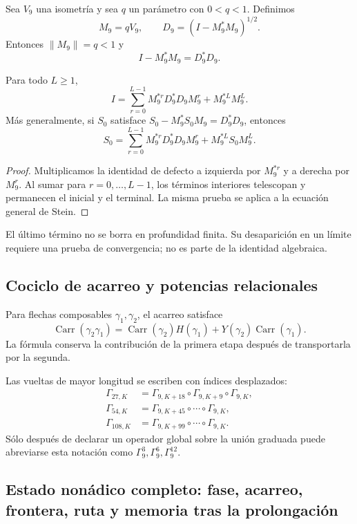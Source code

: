 Sea \(V_9\) una isometría y sea \(q\) un parámetro con \(0<q<1\). Definimos
\[
 M_9=qV_9,
 \qquad
 D_9=(I-M_9^*M_9)^{1/2}.
\]
Entonces \(\|M_9\|=q<1\) y
\[
 I-M_9^*M_9=D_9^*D_9.
\]

\begin{theorem}
\label{p12-83-c7-s1:thm:stein-telescopia-terminal}
Para todo \(L\geq1\),
\[
 \boxed{
 I=
 \sum_{r=0}^{L-1}M_9^{*r}D_9^*D_9M_9^r
 +M_9^{*L}M_9^L.}
\]
Más generalmente, si \(S_0\) satisface
\(S_0-M_9^*S_0M_9=D_9^*D_9\), entonces
\[
 \boxed{
 S_0=
 \sum_{r=0}^{L-1}M_9^{*r}D_9^*D_9M_9^r
 +M_9^{*L}S_0M_9^L.}
\]
\end{theorem}

\begin{proof}
Multiplicamos la identidad de defecto a izquierda por \(M_9^{*r}\) y a
derecha por \(M_9^r\). Al sumar para \(r=0,\ldots,L-1\), los términos
interiores telescopan y permanecen el inicial y el terminal. La misma prueba
se aplica a la ecuación general de Stein.
\end{proof}

El último término no se borra en profundidad finita. Su desaparición en un
límite requiere una prueba de convergencia; no es parte de la identidad
algebraica.

\subsection{Cociclo de acarreo y potencias relacionales}

Para flechas composables \(\gamma_1,\gamma_2\), el acarreo satisface
\[
 \operatorname{Carr}(\gamma_2\gamma_1)
 =\operatorname{Carr}(\gamma_2)H(\gamma_1)
 +Y(\gamma_2)\operatorname{Carr}(\gamma_1).
\]
La fórmula conserva la contribución de la primera etapa después de
transportarla por la segunda.

Las vueltas de mayor longitud se escriben con índices desplazados:
\begin{align*}
 \Gamma_{27,K}
 &=\Gamma_{9,K+18}\circ\Gamma_{9,K+9}\circ\Gamma_{9,K},\\
 \Gamma_{54,K}
 &=\Gamma_{9,K+45}\circ\cdots\circ\Gamma_{9,K},\\
 \Gamma_{108,K}
 &=\Gamma_{9,K+99}\circ\cdots\circ\Gamma_{9,K}.
\end{align*}
Sólo después de declarar un operador global sobre la unión graduada puede
abreviarse esta notación como \(\Gamma_9^3,\Gamma_9^6,\Gamma_9^{12}\).

\subsection{Estado nonádico completo: fase, acarreo, frontera, ruta y memoria tras la prolongación}


